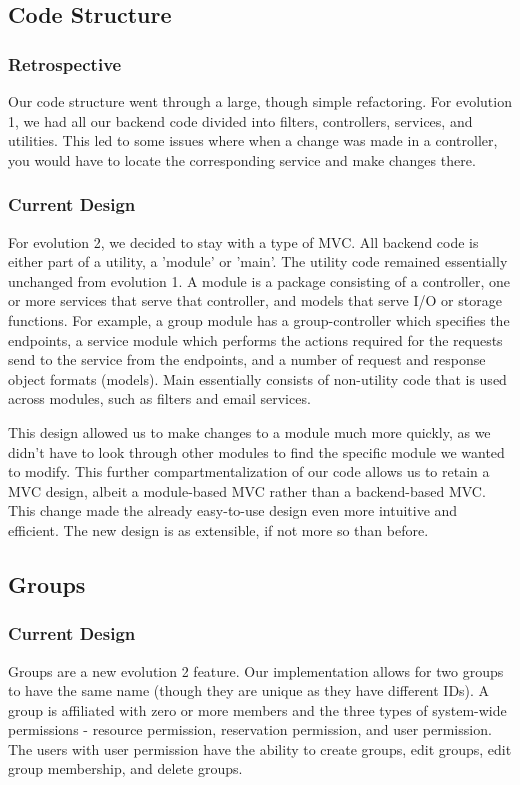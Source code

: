 \documentclass[12pt]{article}
\begin{document}
\subsection{Code Structure}
\subsubsection{Retrospective}
Our code structure went through a large, though simple refactoring. For evolution 1, we had all our backend code divided into filters, controllers, services, and utilities. This led to some issues where when a change was made in a controller, you would have to locate the corresponding service and make changes there. 
\subsubsection{Current Design}
For evolution 2, we decided to stay with a type of MVC. All backend code is either part of a utility, a 'module' or 'main'. The utility code remained essentially unchanged from evolution 1. A module is a package consisting of a controller, one or more services that serve that controller, and models that serve I/O or storage functions. For example, a group module has a group-controller which specifies the endpoints, a service module which performs the actions required for the requests send to the service from the endpoints, and a number of request and response object formats (models). Main essentially consists of non-utility code that is used across modules, such as filters and email services. 

This design allowed us to make changes to a module much more quickly, as we didn't have to look through other modules to find the specific module we wanted to modify. This further compartmentalization of our code allows us to retain a MVC design, albeit a module-based MVC rather than a backend-based MVC. This change made the already easy-to-use design even more intuitive and efficient. The new design is as extensible, if not more so than before. 

\subsection{Groups}
\label{sec:GROUPS}
\subsubsection{Current Design}
Groups are a new evolution 2 feature. Our implementation allows for two groups to have the same name (though they are unique as they have different IDs). A group is affiliated with zero or more members and the three types of system-wide permissions - resource permission, reservation permission, and user permission. The users with user permission have the ability to create groups, edit groups, edit group membership, and delete groups. 
\end{document}
